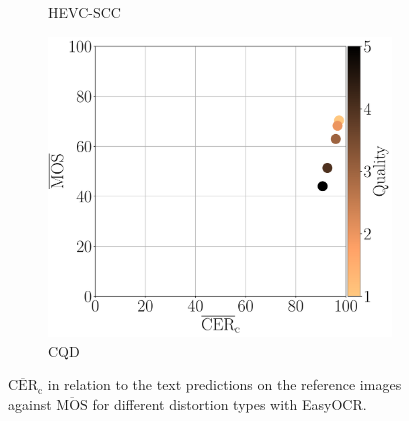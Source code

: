 \begin{figure}[h!]
\begin{subfigure}[b]{0.32\textwidth}
        \caption{HEVC-SCC}
        \label{fig:mos_cer_ref_mean_ezocr_HEVC-SCC}
    \end{subfigure}%
    \hfill
    \begin{subfigure}[b]{0.32\textwidth}
        \includegraphics[width=\textwidth]{../../images/analyze/mos_cer_ref_mean_ezocr_CQD.pdf}
        \caption{CQD}
        \label{fig:mos_cer_ref_mean_ezocr_CQD}
    \end{subfigure}%
    \caption{$\overline{\text{CER}}_{\text{c}}$ in relation to the text predictions on the reference images against $\overline{\text{MOS}}$ for different distortion types with EasyOCR.}
\label{fig:mos_cer_ref_mean_ezocr}
\end{figure}

